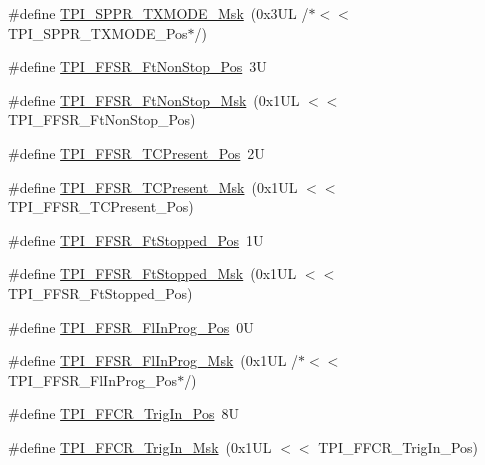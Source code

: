 \begin{DoxyCompactItemize}
\item 
\#define \mbox{\hyperlink{group___c_m_s_i_s___t_p_i_gaca085c8a954393d70dbd7240bb02cc1f}{T\+P\+I\+\_\+\+S\+P\+P\+R\+\_\+\+T\+X\+M\+O\+D\+E\+\_\+\+Msk}}~(0x3\+U\+L /$\ast$$<$$<$ T\+P\+I\+\_\+\+S\+P\+P\+R\+\_\+\+T\+X\+M\+O\+D\+E\+\_\+\+Pos$\ast$/)
\item 
\#define \mbox{\hyperlink{group___c_m_s_i_s___t_p_i_ga9537b8a660cc8803f57cbbee320b2fc8}{T\+P\+I\+\_\+\+F\+F\+S\+R\+\_\+\+Ft\+Non\+Stop\+\_\+\+Pos}}~3U
\item 
\#define \mbox{\hyperlink{group___c_m_s_i_s___t_p_i_gaaa313f980974a8cfc7dac68c4d805ab1}{T\+P\+I\+\_\+\+F\+F\+S\+R\+\_\+\+Ft\+Non\+Stop\+\_\+\+Msk}}~(0x1\+U\+L $<$$<$ T\+P\+I\+\_\+\+F\+F\+S\+R\+\_\+\+Ft\+Non\+Stop\+\_\+\+Pos)
\item 
\#define \mbox{\hyperlink{group___c_m_s_i_s___t_p_i_gad30fde0c058da2ffb2b0a213be7a1b5c}{T\+P\+I\+\_\+\+F\+F\+S\+R\+\_\+\+T\+C\+Present\+\_\+\+Pos}}~2U
\item 
\#define \mbox{\hyperlink{group___c_m_s_i_s___t_p_i_ga0d6bfd263ff2fdec72d6ec9415fb1135}{T\+P\+I\+\_\+\+F\+F\+S\+R\+\_\+\+T\+C\+Present\+\_\+\+Msk}}~(0x1\+U\+L $<$$<$ T\+P\+I\+\_\+\+F\+F\+S\+R\+\_\+\+T\+C\+Present\+\_\+\+Pos)
\item 
\#define \mbox{\hyperlink{group___c_m_s_i_s___t_p_i_gaedf31fd453a878021b542b644e2869d2}{T\+P\+I\+\_\+\+F\+F\+S\+R\+\_\+\+Ft\+Stopped\+\_\+\+Pos}}~1U
\item 
\#define \mbox{\hyperlink{group___c_m_s_i_s___t_p_i_ga1ab6c3abe1cf6311ee07e7c479ce5f78}{T\+P\+I\+\_\+\+F\+F\+S\+R\+\_\+\+Ft\+Stopped\+\_\+\+Msk}}~(0x1\+U\+L $<$$<$ T\+P\+I\+\_\+\+F\+F\+S\+R\+\_\+\+Ft\+Stopped\+\_\+\+Pos)
\item 
\#define \mbox{\hyperlink{group___c_m_s_i_s___t_p_i_ga542ca74a081588273e6d5275ba5da6bf}{T\+P\+I\+\_\+\+F\+F\+S\+R\+\_\+\+Fl\+In\+Prog\+\_\+\+Pos}}~0U
\item 
\#define \mbox{\hyperlink{group___c_m_s_i_s___t_p_i_ga63dfb09259893958962914fc3a9e3824}{T\+P\+I\+\_\+\+F\+F\+S\+R\+\_\+\+Fl\+In\+Prog\+\_\+\+Msk}}~(0x1\+U\+L /$\ast$$<$$<$ T\+P\+I\+\_\+\+F\+F\+S\+R\+\_\+\+Fl\+In\+Prog\+\_\+\+Pos$\ast$/)
\item 
\#define \mbox{\hyperlink{group___c_m_s_i_s___t_p_i_gaa7ea11ba6ea75b541cd82e185c725b5b}{T\+P\+I\+\_\+\+F\+F\+C\+R\+\_\+\+Trig\+In\+\_\+\+Pos}}~8U
\item 
\#define \mbox{\hyperlink{group___c_m_s_i_s___t_p_i_ga360b413bc5da61f751546a7133c3e4dd}{T\+P\+I\+\_\+\+F\+F\+C\+R\+\_\+\+Trig\+In\+\_\+\+Msk}}~(0x1\+U\+L $<$$<$ T\+P\+I\+\_\+\+F\+F\+C\+R\+\_\+\+Trig\+In\+\_\+\+Pos)

\end{DoxyCompactItemize}
